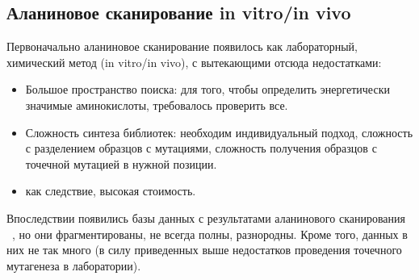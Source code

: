\begin{figure}
\end{figure}
\subsection{Аланиновое сканирование in vitro/in vivo}
Первоначально аланиновое сканирование появилось как лабораторный, химический метод (in vitro/in vivo), с вытекающими отсюда недостатками:
\begin{itemize}
\item Большое пространство поиска: для того, чтобы определить энергетически значимые аминокислоты, требовалось проверить все.
\item Сложность синтеза библиотек: необходим индивидуальный подход, сложность с разделением образцов с мутациями, сложность получения образцов с точечной мутацией в нужной позиции.
\item как следствие, высокая стоимость.
\end{itemize}
Впоследствии появились базы данных с результатами аланинового сканирования ~\cite{asedb2001, bid}, но они фрагментированы, не всегда полны, разнородны. Кроме того, данных в них не так много (в силу приведенных выше недостатков проведения точечного мутагенеза в лаборатории).

